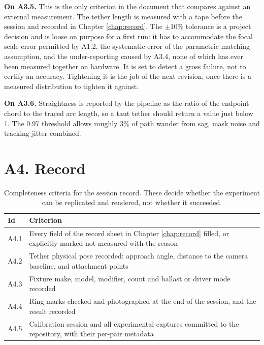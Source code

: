 \textbf{On A3.5.} This is the only criterion in the document that compares
against an external measurement. The tether length is measured with a tape
before the session and recorded in Chapter \ref{chap:record}. The
$\pm 10\%$ tolerance is a project decision and is loose on purpose for a first
run: it has to accommodate the focal scale error permitted by A1.2, the
systematic error of the parametric matching assumption, and the under-reporting
caused by A3.4, none of which has ever been measured together on hardware. It
is set to detect a gross failure, not to certify an accuracy. Tightening it is
the job of the next revision, once there is a measured distribution to tighten
it against.

\textbf{On A3.6.} Straightness is reported by the pipeline as the ratio of
the endpoint chord to the traced arc length, so a taut tether should return a
value just below 1. The 0.97 threshold allows roughly 3\% of path wander from
sag, mask noise and tracking jitter combined.

\section{A4. Record}

\begin{table}[htbp]
\centering
\caption[Record acceptance criteria]{Completeness criteria for the session
record. These decide whether the experiment can be replicated and rendered,
not whether it succeeded.}
\label{tab:crit-record}
\begin{tabularx}{\textwidth}{@{}l X@{}}
\toprule
\textbf{Id} & \textbf{Criterion} \\
\midrule
A4.1 & Every field of the record sheet in Chapter \ref{chap:record} filled, or
       explicitly marked not measured with the reason \\
A4.2 & Tether physical pose recorded: approach angle, distance to the camera
       baseline, and attachment points \\
A4.3 & Fixture make, model, modifier, count and ballast or driver mode
       recorded \\
A4.4 & Ring marks checked and photographed at the end of the session, and the
       result recorded \\
A4.5 & Calibration session and all experimental captures committed to the
       repository, with their per-pair metadata \\
\bottomrule
\end{tabularx}
\end{table}

